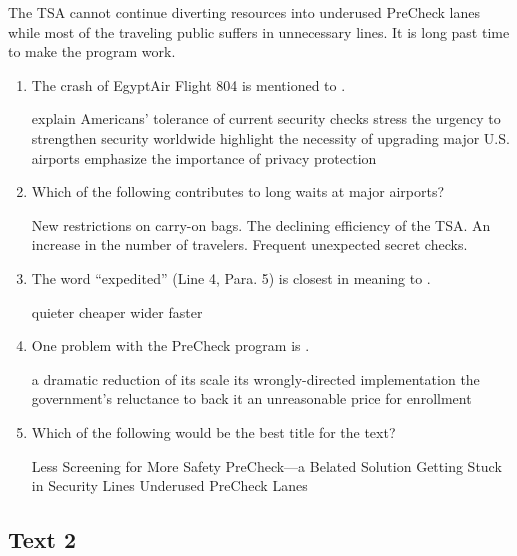 The TSA cannot continue diverting resources into underused PreCheck
lanes while most of the traveling public suffers in unnecessary lines.
It is long past time to make the program work.

\begin{enumerate}[resume]
	\item
The crash of EgyptAir Flight 804 is mentioned to \lineread.


\fourchoices
{explain Americans' tolerance of current security checks}
{stress the urgency to strengthen security worldwide}
{highlight the necessity of upgrading major U.S. airports}
{emphasize the importance of privacy protection}



\item
Which of the following contributes to long waits at major airports?


\fourchoices
{New restrictions on carry-on bags.}
{The declining efficiency of the TSA.}
{An increase in the number of travelers.}
{Frequent unexpected secret checks.}



\item
The word ``expedited'' (Line 4, Para. 5) is closest in meaning to \lineread.


\fourchoices
{quieter}
{cheaper}
{wider}
{faster}





\item
One problem with the PreCheck program is  \lineread.


\fourchoices
{a dramatic reduction of its scale}
{its wrongly-directed implementation}
{the government's reluctance to back it}
{an unreasonable price for enrollment}


\item
Which of the following would be the best title for the text?


\fourchoices
{Less Screening for More Safety}
{PreCheck---a Belated Solution}
{Getting Stuck in Security Lines}
{Underused PreCheck Lanes}


\end{enumerate}


\newpage
\subsection{Text 2}


